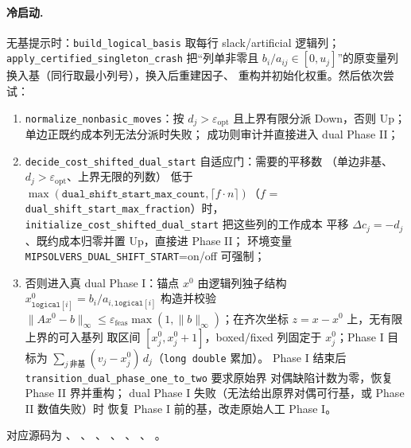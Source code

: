 \paragraph{冷启动.}
无基提示时：\texttt{build\_logical\_basis} 取每行 slack/artificial 逻辑列；
\texttt{apply\_certified\_singleton\_crash} 把``列单非零且
$b_i/a_{ij} \in [0, u_j]$''的原变量列换入基（同行取最小列号），换入后重建因子、
重构并初始化权重。然后依次尝试：
\begin{enumerate}
  \item \texttt{normalize\_nonbasic\_moves}：按 $d_j > \varepsilon_{\text{opt}}$
        且上界有限分派 Down，否则 Up；单边正既约成本列无法分派时失败；
        成功则审计并直接进入 dual Phase II；
  \item \texttt{decide\_cost\_shifted\_dual\_start} 自适应门：需要的平移数
        （单边非基、$d_j > \varepsilon_{\text{opt}}$、上界无限的列数）
        低于 $\max(\texttt{dual\_shift\_start\_max\_count},
        \lceil f \cdot n \rceil)$（$f$ =
        \texttt{dual\_shift\_start\_max\_fraction}）时，
        \texttt{initialize\_cost\_shifted\_dual\_start} 把这些列的工作成本
        平移 $\Delta c_j = -d_j$、既约成本归零并置 Up，直接进 Phase II；
        环境变量 \texttt{MIPSOLVERS\_DUAL\_SHIFT\_START}=on/off 可强制；
  \item 否则进入真 dual Phase I：锚点 $x^0$ 由逻辑列独子结构
        $x^0_{\texttt{logical}[i]} = b_i / a_{i,\texttt{logical}[i]}$ 构造并校验
        $\|A x^0 - b\|_{\infty} \le \varepsilon_{\text{feas}} \max(1,
        \|b\|_{\infty})$；在齐次坐标 $z = x - x^0$ 上，无有限上界的可入基列
        取区间 $[x^0_j, x^0_j + 1]$，boxed/fixed 列固定于 $x^0_j$；Phase I 目标为
        $\sum_{j\ \text{非基}} (v_j - x^0_j)\, d_j$（\texttt{long double} 累加）。
        Phase I 结束后 \texttt{transition\_dual\_phase\_one\_to\_two} 要求原始界
        对偶缺陷计数为零，恢复 Phase II 界并重构；
        dual Phase I 失败（无法给出原界对偶可行基，或 Phase II 数值失败）时
        恢复 Phase I 前的基，改走原始人工 Phase I。
\end{enumerate}
对应源码为 、
、
、
、
、
、
。

